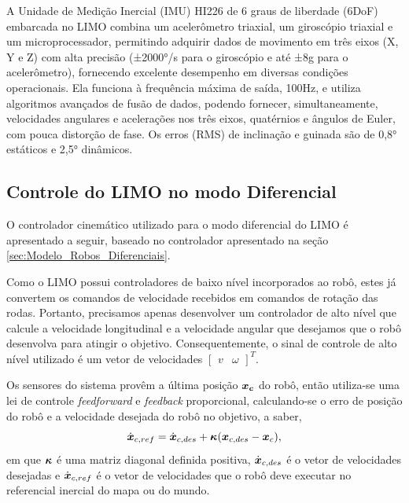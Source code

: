         A Unidade de Medição Inercial (IMU) HI226 de 6 graus de liberdade (6DoF) embarcada no LIMO combina um acelerômetro triaxial, um giroscópio triaxial e um microprocessador, permitindo adquirir dados de movimento em três eixos (X, Y e Z) com alta precisão (±2000°/s para o giroscópio e até ±8g para o acelerômetro), fornecendo excelente desempenho em diversas condições operacionais. Ela funciona à frequência máxima de saída, 100Hz, e utiliza algoritmos avançados de fusão de dados, podendo fornecer, simultaneamente, velocidades angulares e acelerações nos três eixos, quatérnios e ângulos de Euler, com pouca distorção de fase. Os erros (RMS) de inclinação e guinada são de 0,8° estáticos e 2,5° dinâmicos.


    \subsection{Controle do LIMO no modo Diferencial}
    \label{sec:Controle_Dif_LIMO}
    
        O controlador cinemático utilizado para o modo diferencial do LIMO é apresentado a seguir, baseado no controlador apresentado na seção \ref{sec:Modelo_Robos_Diferenciais}.
        
        Como o LIMO possui controladores de baixo nível incorporados ao robô, estes já convertem os comandos de velocidade recebidos em comandos de rotação das rodas. Portanto, precisamos apenas desenvolver um controlador de alto nível que calcule a velocidade longitudinal e a velocidade angular que desejamos que o robô desenvolva para atingir o objetivo. Consequentemente, o sinal de controle de alto nível utilizado é um vetor de velocidades $\begin{bmatrix}v & \omega \end{bmatrix}^{T}$.
        
        Os sensores do sistema provêm a última posição $\boldsymbol{x_c}$ do robô, então utiliza-se uma lei de controle \textit{feedforward} e \textit{feedback} proporcional, calculando-se o erro de posição do robô e a velocidade desejada do robô no objetivo, a saber,
        \begin{equation}
            \dot{\boldsymbol{x}}_{c,ref} = \dot{\boldsymbol{x}}_{c,des} + \boldsymbol{\kappa}(\boldsymbol{x}_{c,des} - \boldsymbol{x}_c),
            \label{eq:ff_fb_law_limo}
        \end{equation}
        em que $\boldsymbol{\kappa}$ é uma matriz diagonal definida positiva, $\dot{\boldsymbol{x}}_{c,des}$ é o vetor de velocidades desejadas e $\dot{\boldsymbol{x}}_{c,ref}$ é o vetor de velocidades que o robô deve executar no referencial inercial do mapa ou do mundo.
    
